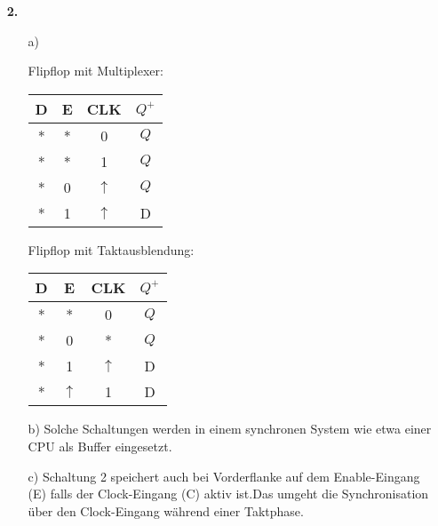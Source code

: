 \documentclass[a4paper,10pt]{scrartcl}
\begin{document}
\begin{enumerate}
\begin{tikzpicture}[x=0.5cm,y=0.5cm]
    \end{tikzpicture}

    \item[\textbf{2.}]
        \begin{enumerate}
            \item[a)]
                \begin{minipage}[t]{0.4\textwidth}
                Flipflop mit Multiplexer:\\ 

                    \begin{tabular}{|c|c|c||c|}
                        \hline
                        D & E & CLK & $Q^+$ \\ \hline
                        * & * & 0   & $Q$ \\
                        * & * & 1   & $Q$ \\
                        * & 0 & $\uparrow$ & $Q$ \\
                        * & 1 & $\uparrow$ & D \\
                        \hline
                    \end{tabular}

                \end{minipage}
                \begin{minipage}[t]{0.4\textwidth}
                Flipflop mit Taktausblendung:\\

                    \begin{tabular}{|c|c|c||c|}
                        \hline
                        D & E & CLK & $Q^+$ \\ \hline
                        * & * & 0   & $Q$ \\
                        * & 0 & *   & $Q$ \\
                        * & 1 & $\uparrow$ & D \\
                        * & $\uparrow$ & 1 & D \\
                        \hline
                    \end{tabular}
                \end{minipage}

            \item[b)]
                Solche Schaltungen werden in einem synchronen System wie etwa einer CPU als Buffer eingesetzt.
            \item[c)]
                Schaltung 2 speichert auch bei Vorderflanke auf dem Enable-Eingang (E) falls der Clock-Eingang (C) aktiv ist.Das umgeht die Synchronisation über den Clock-Eingang während einer Taktphase.


\end{enumerate}
\end{enumerate}
\end{document}
